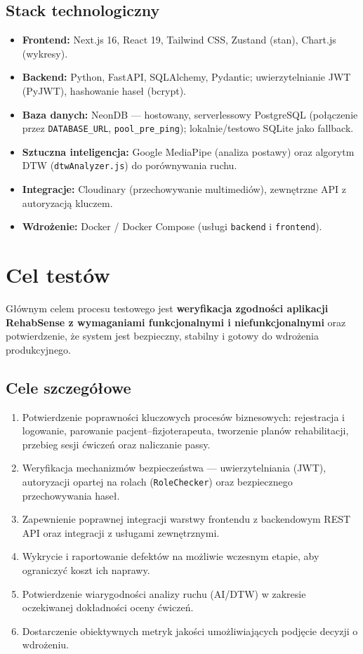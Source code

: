 \documentclass[11pt,a4paper]{article}
\begin{document}
\subsection{Stack technologiczny}
\begin{itemize}
  \item \textbf{Frontend:} Next.js 16, React 19, Tailwind CSS, Zustand (stan), Chart.js (wykresy).
  \item \textbf{Backend:} Python, FastAPI, SQLAlchemy, Pydantic; uwierzytelnianie JWT (PyJWT), hashowanie haseł (bcrypt).
  \item \textbf{Baza danych:} NeonDB — hostowany, serverlessowy PostgreSQL (połączenie przez \texttt{DATABASE\_URL}, \texttt{pool\_pre\_ping}); lokalnie/testowo SQLite jako fallback.
  \item \textbf{Sztuczna inteligencja:} Google MediaPipe (analiza postawy) oraz algorytm DTW (\texttt{dtwAnalyzer.js}) do porównywania ruchu.
  \item \textbf{Integracje:} Cloudinary (przechowywanie multimediów), zewnętrzne API z autoryzacją kluczem.
  \item \textbf{Wdrożenie:} Docker / Docker Compose (usługi \texttt{backend} i \texttt{frontend}).
\end{itemize}

\section{Cel testów}

Głównym celem procesu testowego jest \textbf{weryfikacja zgodności aplikacji RehabSense z wymaganiami funkcjonalnymi i niefunkcjonalnymi} oraz potwierdzenie, że system jest bezpieczny, stabilny i gotowy do wdrożenia produkcyjnego.

\subsection{Cele szczegółowe}
\begin{enumerate}
  \item Potwierdzenie poprawności kluczowych procesów biznesowych: rejestracja i logowanie, parowanie pacjent–fizjoterapeuta, tworzenie planów rehabilitacji, przebieg sesji ćwiczeń oraz naliczanie passy.
  \item Weryfikacja mechanizmów bezpieczeństwa — uwierzytelniania (JWT), autoryzacji opartej na rolach (\texttt{RoleChecker}) oraz bezpiecznego przechowywania haseł.
  \item Zapewnienie poprawnej integracji warstwy frontendu z backendowym REST API oraz integracji z usługami zewnętrznymi.
  \item Wykrycie i raportowanie defektów na możliwie wczesnym etapie, aby ograniczyć koszt ich naprawy.
  \item Potwierdzenie wiarygodności analizy ruchu (AI/DTW) w zakresie oczekiwanej dokładności oceny ćwiczeń.
  \item Dostarczenie obiektywnych metryk jakości umożliwiających podjęcie decyzji o wdrożeniu.
\end{enumerate}
\end{document}
